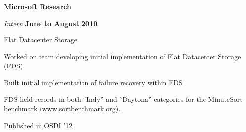 \pagebreak

\href{https://research.microsoft.com}{\textbf{Microsoft Research}}
\begin{outerlist}

\item[] \textit{Intern}
    \hfill \textbf{June to August 2010}
    \begin{innerlist}
        \item Flat Datacenter Storage
        \begin{innerlist}
           \item Worked on team developing initial implementation of Flat
Datacenter Storage (FDS)
           \item Built initial implementation of failure recovery within
FDS
           \item FDS held records in both ``Indy'' and
``Daytona'' categories for the MinuteSort benchmark
(\href{https://www.sortbenchmark.org}{www.sortbenchmark.org}).
           \item Published in OSDI '12
        \end{innerlist}
     \end{innerlist}
\end{outerlist}
